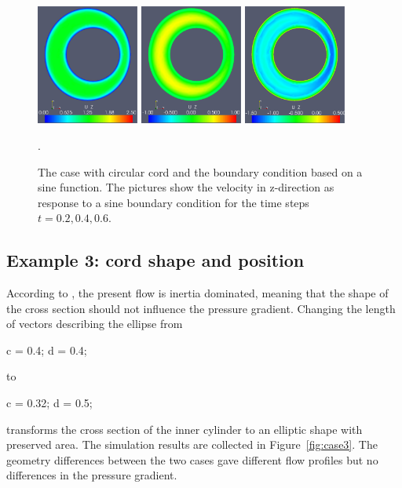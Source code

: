 \begin{figure}\begin{center}
\includegraphics[width=0.3\textwidth]{chapters/hentschel/pdf/sin_sysmax_nmb2.pdf}
\includegraphics[width=0.3\textwidth]{chapters/hentschel/pdf/sin_sysdia_nmb4.pdf}
\includegraphics[width=0.3\textwidth]{chapters/hentschel/pdf/sin_diamin_nmb6.pdf}
\caption{The case with circular cord and the boundary condition based on a
    sine function. The pictures show the velocity in z-direction as response to a sine boundary condition for the time steps $t=0.2, 0.4, 0.6$.}
\label{fig:case2}.
\end{center}\end{figure}

\subsection{Example 3: cord shape and position}

According
to \citet{LothYardimciAlperin2001,AlperinMazdaLichtorEtAl2006}, the
present flow is inertia dominated, meaning that the shape of the cross
section should not influence the pressure gradient. Changing the
length of vectors describing the ellipse from
\begin{anycode}
c = 0.4;
d = 0.4;
\end{anycode}
to
\begin{anycode}
c = 0.32;
d = 0.5;
\end{anycode}
transforms the cross section of the inner cylinder to an elliptic
shape with preserved area. The simulation results are collected in
Figure~\ref{fig:case3}. The geometry differences between the two cases
gave different flow profiles but no differences in the pressure
gradient.

